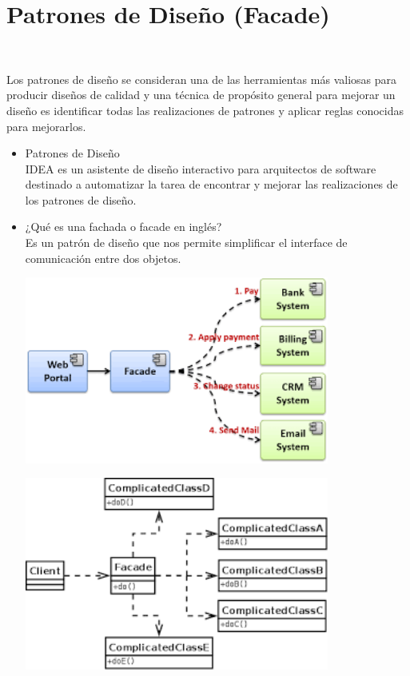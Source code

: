 \section{Patrones de Diseño (Facade)} 
\textbf{}\\
\begin{flushleft}
Los patrones de diseño se consideran una de las herramientas más valiosas para producir diseños de calidad y una técnica de propósito general para mejorar un diseño es identificar todas las realizaciones de patrones y aplicar reglas conocidas para mejorarlos.

\begin{itemize}
	\item Patrones de Diseño
	\\IDEA es un asistente de diseño interactivo para arquitectos de software destinado a automatizar la tarea de encontrar y mejorar las realizaciones de los patrones de diseño.


	


	\item ¿Qué es una fachada o facade en inglés?
	\\ Es un patrón de diseño que nos permite simplificar el interface de comunicación entre dos objetos.
	\begin{center}
	\includegraphics[width=10cm]{./Imagenes/1} 
	\end{center}

	
	\begin{center}
	\includegraphics[width=10cm]{./Imagenes/2} 
	\end{center}



\end{itemize}
\end{flushleft}
